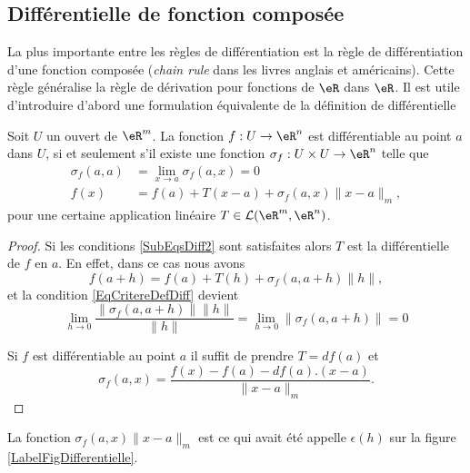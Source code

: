 \subsection{Différentielle de fonction composée}

La plus importante entre les règles de différentiation est la règle de différentiation d'une fonction composée (\emph{chain rule} dans les livres anglais et américains). Cette règle généralise la règle de dérivation pour fonctions de $\eR$ dans $\eR$. Il est utile d'introduire d'abord une formulation équivalente de la définition de différentielle
\begin{lemma}\label{Def_diff2}
  Soit $U$ un ouvert de $\eR^m$. La fonction $f: U\to\eR^n$ est différentiable au point $a$ dans $U$, si et seulement s'il existe une fonction $\sigma_f: U\times U\to \eR^n$ telle que
  \begin{subequations}		\label{SubEqsDiff2}
	  \begin{align}
  		\sigma_f(a,a)&=\lim_{x\to a} \sigma_f(a,x)=0\\
		 f(x)&=f(a)+T(x-a)+\sigma_f(a,x)\|x-a\|_m,   \label{def_diff2}
	  \end{align}
  \end{subequations}
pour une certaine application linéaire $T\in\mathcal{L}(\eR^m,\eR^n)$.
\end{lemma}
\begin{proof}
	Si les conditions \eqref{SubEqsDiff2} sont satisfaites alors $T$ est la différentielle de $f$ en $a$. En effet, dans ce cas nous avons
	\begin{equation}
		f(a+h)=f(a)+T(h)+\sigma_f(a,a+h)\| h \|,
	\end{equation}
	et la condition \eqref{EqCritereDefDiff} devient
	\begin{equation}
		\lim_{h\to 0} \frac{ \| \sigma_f(a,a+h) \|\| h \| }{ \| h \| }=\lim_{h\to 0} \| \sigma_f(a,a+h)\| =0
	\end{equation}
	
 
Si $f$ est différentiable au point $a$ il suffit de prendre $T=df(a)$ et 
\[
\sigma_f(a,x)=\frac{f(x)-f(a)-df(a).(x-a)}{\|x-a\|_m}.
\]
\end{proof}

\begin{remark}
	La fonction $\sigma_f(a,x)\| x-a \|_m$ est ce qui avait été appelle $\epsilon(h)$ sur la figure \ref{LabelFigDifferentielle}.
\end{remark}

